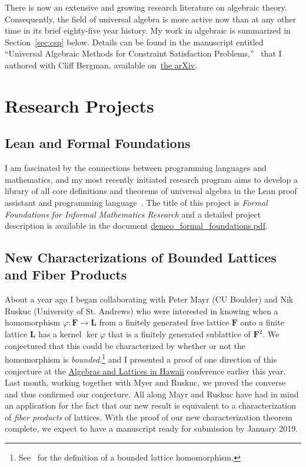There is now an extensive and growing research literature on algebraic \csp theory. Consequently, the field of universal algebra is more active now than at any other time in its brief eighty-five year history. My work in algebraic \csp is summarized in Section~\ref{sec:csp} below. Details can be found in the manuscript entitled ``Universal Algebraic Methods for Constraint Satisfaction Problems,''~\cite{Bergman-DeMeo:2016} that I authored with Cliff Bergman, available on~\href{https://arxiv.org/abs/1611.02867}{the arXiv}.

\newpage

\null

\vskip5mm

\section{Research Projects}

\subsection{Lean and Formal Foundations}
\label{sec:formal}
I am fascinated by the connections between programming languages and mathematics, and my most recently initiated research program aims to develop a library of all core definitions and theorems of universal algebra in the Lean proof assistant and programming language~\cite{lean}.
The title of this project is \emph{Formal Foundations for Informal Mathematics Research} and a detailed project description is available in the document 
\href{https://github.com/williamdemeo/job-app/blob/master/research/demeo_formal_foundations.pdf}{demeo\_formal\_foundations.pdf}.

\subsection{New Characterizations of Bounded Lattices and Fiber Products}
\label{sec:fiber}
About a year ago I began collaborating with Peter Mayr (CU Boulder) and Nik Ruskuc (University of St. Andrews) who were interested in knowing when a homomorphism $\varphi \colon \mathbf{F} \to \mathbf{L}$ from a finitely generated free lattice $\mathbf{F}$ onto a finite lattice $\mathbf L$ has a kernel $\ker \varphi$ that is a finitely generated sublattice of $\mathbf{F}^2$.  We conjectured that this could be characterized by whether or not the homomorphism is \emph{bounded}.\footnote{See~\cite{MR1319815} for the definition of a bounded lattice homomorphism.} and I presented a proof of one direction of this conjecture at the \href{https://universalalgebra.github.io/ALH-2018/}{Algebras and Lattices in Hawaii} conference earlier this year. Last month, working together with Myer and Ruskuc, we proved the converse and thus confirmed our conjecture.  All along Mayr and Ruskuc have had in mind an application for the fact that our new result is equivalent to a characterization of \emph{fiber products} of lattices.  With the proof of our new characterization theorem complete, we expect to have a manuscript ready for submission by January 2019.  


